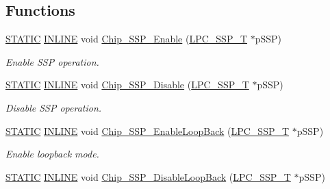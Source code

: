 \subsection*{Functions}
\begin{DoxyCompactItemize}
\item 
\hyperlink{group___l_p_c___types___public___macros_ga10b2d890d871e1489bb02b7e70d9bdfb}{S\+T\+A\+T\+IC} \hyperlink{spifi__18xx__43xx_8h_a2eb6f9e0395b47b8d5e3eeae4fe0c116}{I\+N\+L\+I\+NE} void \hyperlink{group___s_s_p__18_x_x__43_x_x_gaf49b9a4689c9ae39bbd8c1ac20d31073}{Chip\+\_\+\+S\+S\+P\+\_\+\+Enable} (\hyperlink{struct_l_p_c___s_s_p___t}{L\+P\+C\+\_\+\+S\+S\+P\+\_\+T} $\ast$p\+S\+SP)
\begin{DoxyCompactList}\small\item\em Enable S\+SP operation. \end{DoxyCompactList}\item 
\hyperlink{group___l_p_c___types___public___macros_ga10b2d890d871e1489bb02b7e70d9bdfb}{S\+T\+A\+T\+IC} \hyperlink{spifi__18xx__43xx_8h_a2eb6f9e0395b47b8d5e3eeae4fe0c116}{I\+N\+L\+I\+NE} void \hyperlink{group___s_s_p__18_x_x__43_x_x_ga3033c296868595a01dd74ecccaed6090}{Chip\+\_\+\+S\+S\+P\+\_\+\+Disable} (\hyperlink{struct_l_p_c___s_s_p___t}{L\+P\+C\+\_\+\+S\+S\+P\+\_\+T} $\ast$p\+S\+SP)
\begin{DoxyCompactList}\small\item\em Disable S\+SP operation. \end{DoxyCompactList}\item 
\hyperlink{group___l_p_c___types___public___macros_ga10b2d890d871e1489bb02b7e70d9bdfb}{S\+T\+A\+T\+IC} \hyperlink{spifi__18xx__43xx_8h_a2eb6f9e0395b47b8d5e3eeae4fe0c116}{I\+N\+L\+I\+NE} void \hyperlink{group___s_s_p__18_x_x__43_x_x_ga8683ccce6ba5578103efcb791f39cff8}{Chip\+\_\+\+S\+S\+P\+\_\+\+Enable\+Loop\+Back} (\hyperlink{struct_l_p_c___s_s_p___t}{L\+P\+C\+\_\+\+S\+S\+P\+\_\+T} $\ast$p\+S\+SP)
\begin{DoxyCompactList}\small\item\em Enable loopback mode. \end{DoxyCompactList}\item 
\hyperlink{group___l_p_c___types___public___macros_ga10b2d890d871e1489bb02b7e70d9bdfb}{S\+T\+A\+T\+IC} \hyperlink{spifi__18xx__43xx_8h_a2eb6f9e0395b47b8d5e3eeae4fe0c116}{I\+N\+L\+I\+NE} void \hyperlink{group___s_s_p__18_x_x__43_x_x_gaa733ed4b0773cda022ad87ff41304c40}{Chip\+\_\+\+S\+S\+P\+\_\+\+Disable\+Loop\+Back} (\hyperlink{struct_l_p_c___s_s_p___t}{L\+P\+C\+\_\+\+S\+S\+P\+\_\+T} $\ast$p\+S\+SP)

\end{DoxyCompactItemize}
